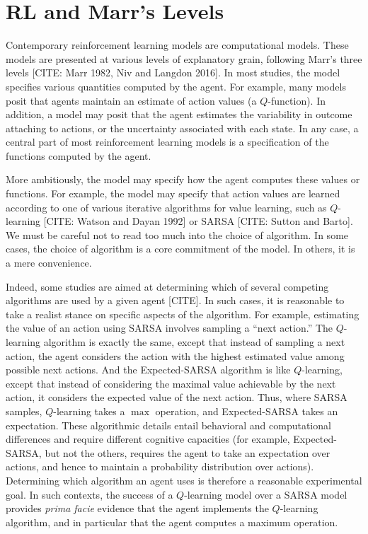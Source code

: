 \section{RL and Marr's Levels}

Contemporary reinforcement learning models are computational models.
These models are presented at various levels of explanatory grain, following Marr's three levels [CITE: Marr 1982, Niv and Langdon 2016].
In most studies, the model specifies various quantities computed by the agent.
For example, many models posit that agents maintain an estimate of action values (a $Q$-function).
In addition, a model may posit that the agent estimates the variability in outcome attaching to actions, or the uncertainty associated with each state.
In any case, a central part of most reinforcement learning models is a specification of the functions computed by the agent.

More ambitiously, the model may specify how the agent computes these values or functions.
For example, the model may specify that action values are learned according to one of various iterative algorithms for value learning, such as $Q$-learning [CITE: Watson and Dayan 1992] or SARSA [CITE: Sutton and Barto].
We must be careful not to read too much into the choice of algorithm.
In some cases, the choice of algorithm is a core commitment of the model.
In others, it is a mere convenience.

Indeed, some studies are aimed at determining which of several competing algorithms are used by a given agent [CITE].
In such cases, it is reasonable to take a realist stance on specific aspects of the algorithm.
For example, estimating the value of an action using SARSA involves sampling a ``next action.'' 
The $Q$-learning algorithm is exactly the same, except that instead of sampling a next action, the agent considers the action with the highest estimated value among possible next actions.
And the Expected-SARSA algorithm is like $Q$-learning, except that instead of considering the maximal value achievable by the next action, it considers the expected value of the next action.
Thus, where SARSA samples, $Q$-learning takes a $\max$ operation, and Expected-SARSA takes an expectation.
These algorithmic details entail behavioral and computational differences and require different cognitive capacities (for example, Expected-SARSA, but not the others, requires the agent to take an expectation over actions, and hence to maintain a probability distribution over actions).
Determining which algorithm an agent uses is therefore a reasonable experimental goal.
In such contexts, the success of a $Q$-learning model over a SARSA model provides \emph{prima facie} evidence that the agent implements the $Q$-learning algorithm, and in particular that the agent computes a maximum operation.

